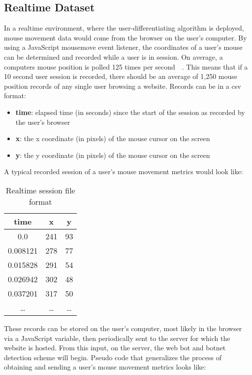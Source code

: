\subsection{Realtime Dataset}\label{subsec:realtime-dataset}
In a realtime environment, where the user-differentiating algorithm is deployed, mouse movement data would come from the browser on the user's computer.
By using a JavaScript mousemove event listener, the coordinates of a user's mouse can be determined and recorded while a user is in session.
On average, a computers mouse position is polled 125 times per second~\cite{mouse_dpi_and_polling_rate_explained}~\cite{mouse_dpi_and_usb_polling_rate}.
This means that if a 10 second user session is recorded, there should be an average of 1,250 mouse position records of any single user browsing a website.
Records can be in a csv format:
\begin{itemize}
    \item \textbf{time}: elapsed time (in seconds) since the start of the session as recorded by the user's browser
    \item \textbf{x}: the x coordinate (in pixels) of the mouse cursor on the screen
    \item \textbf{y}: the y coordinate (in pixels) of the mouse cursor on the screen
\end{itemize}
A typical recorded session of a user's mouse movement metrics would look like:
\begin{table}
    \centering
    \caption{Realtime session file format}
    \bigskip
    \label{tab:realtime-dataset-format}
    \begin{tabular}{ |c|c|c| }
        \hline
        \textbf{time} & \textbf{x} & \textbf{y} \\
        \hline
        0.0 & 241 & 93 \\
        0.008121 & 278 & 77 \\
        0.015828 & 291 & 54 \\
        0.026942 & 302 & 48 \\
        0.037201 & 317 & 50 \\
        \ldots & \ldots & \ldots \\
        \hline
    \end{tabular}
 \end{table}
These records can be stored on the user's computer, most likely in the browser via a JavaScript variable, then periodically sent to the server for which the website is hosted.
From this input, on the server, the web bot and botnet detection scheme will begin.
Pseudo code that generalizes the process of obtaining and sending a user's mouse movement metrics looks like:

